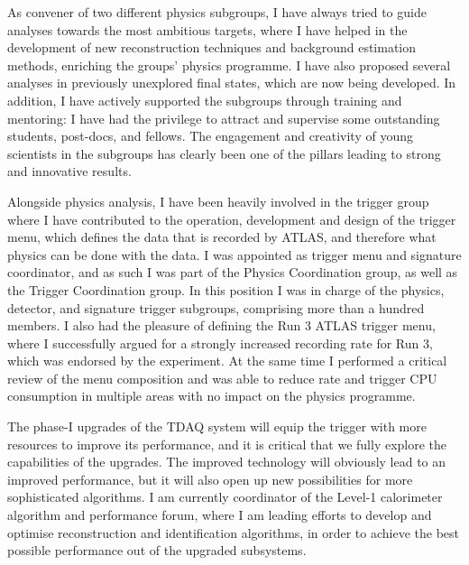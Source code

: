 \documentclass[11pt,a4paper,sans]{moderncv}        %
\begin{document}
As convener of two different physics subgroups, I have always tried to guide analyses towards the most ambitious targets, where I have helped in the development of new reconstruction techniques and background estimation methods, enriching the groups' physics programme.
I have also proposed several analyses in previously unexplored final states, which are now being developed. In addition, I have actively supported the subgroups through training and mentoring: I have had the privilege to attract and supervise some outstanding students, post-docs, and fellows. The engagement and creativity of young scientists in the subgroups has clearly been one of the pillars leading to strong and innovative results.
\newline


Alongside physics analysis, I have been heavily involved in the trigger group where I have contributed to the operation, development and design of the trigger menu, which defines the data that is recorded by ATLAS, and therefore what physics can be done with the data. I was appointed as trigger menu and signature coordinator, and as such I was part of the Physics Coordination group, as well as the Trigger Coordination group. In this position I was in charge of the physics, detector, and signature trigger subgroups, comprising more than a hundred members.
I also had the pleasure of defining the Run 3 ATLAS trigger menu, where I successfully argued for a strongly increased recording rate for Run 3, which was endorsed by the experiment. At the same time I performed a critical review of the menu composition and was able to reduce rate and trigger CPU consumption in multiple areas with no impact on the physics programme.
\newline

The phase-I upgrades of the TDAQ system will equip the trigger with more resources to improve its performance, and it is critical that we fully explore the capabilities of the upgrades. The improved technology will obviously lead to an improved performance, but it will also open up new possibilities for more sophisticated algorithms.
I am currently coordinator of the Level-1 calorimeter algorithm and performance forum, where I am leading efforts to develop and optimise reconstruction and identification algorithms, in order to achieve the best possible performance out of the upgraded subsystems. 
\newline

\end{document}
